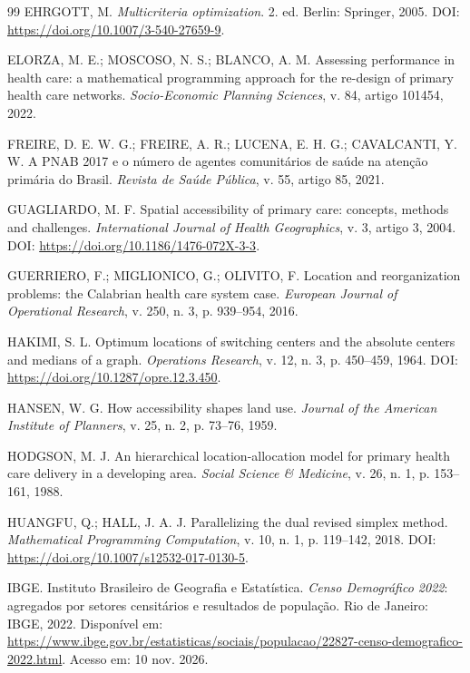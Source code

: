 \documentclass[12pt,a4paper,oneside]{report}
\begin{document}
\begin{thebibliography}{99}
EHRGOTT, M. \textit{Multicriteria optimization}. 2. ed. Berlin: Springer, 2005. DOI: \url{https://doi.org/10.1007/3-540-27659-9}.

ELORZA, M. E.; MOSCOSO, N. S.; BLANCO, A. M. Assessing performance in health care: a mathematical programming approach for the re-design of primary health care networks. \textit{Socio-Economic Planning Sciences}, v. 84, artigo 101454, 2022.

FREIRE, D. E. W. G.; FREIRE, A. R.; LUCENA, E. H. G.; CAVALCANTI, Y. W. A PNAB 2017 e o número de agentes comunitários de saúde na atenção primária do Brasil. \textit{Revista de Saúde Pública}, v. 55, artigo 85, 2021.

GUAGLIARDO, M. F. Spatial accessibility of primary care: concepts, methods and challenges. \textit{International Journal of Health Geographics}, v. 3, artigo 3, 2004. DOI: \url{https://doi.org/10.1186/1476-072X-3-3}.

GUERRIERO, F.; MIGLIONICO, G.; OLIVITO, F. Location and reorganization problems: the Calabrian health care system case. \textit{European Journal of Operational Research}, v. 250, n. 3, p. 939--954, 2016.

HAKIMI, S. L. Optimum locations of switching centers and the absolute centers and medians of a graph. \textit{Operations Research}, v. 12, n. 3, p. 450--459, 1964. DOI: \url{https://doi.org/10.1287/opre.12.3.450}.

HANSEN, W. G. How accessibility shapes land use. \textit{Journal of the American Institute of Planners}, v. 25, n. 2, p. 73--76, 1959.

HODGSON, M. J. An hierarchical location-allocation model for primary health care delivery in a developing area. \textit{Social Science \& Medicine}, v. 26, n. 1, p. 153--161, 1988.

HUANGFU, Q.; HALL, J. A. J. Parallelizing the dual revised simplex method. \textit{Mathematical Programming Computation}, v. 10, n. 1, p. 119--142, 2018. DOI: \url{https://doi.org/10.1007/s12532-017-0130-5}.

IBGE. Instituto Brasileiro de Geografia e Estatística. \textit{Censo Demográfico 2022}: agregados por setores censitários e resultados de população. Rio de Janeiro: IBGE, 2022. Disponível em: \url{https://www.ibge.gov.br/estatisticas/sociais/populacao/22827-censo-demografico-2022.html}. Acesso em: 10 nov. 2026.


\end{thebibliography}
\end{document}
